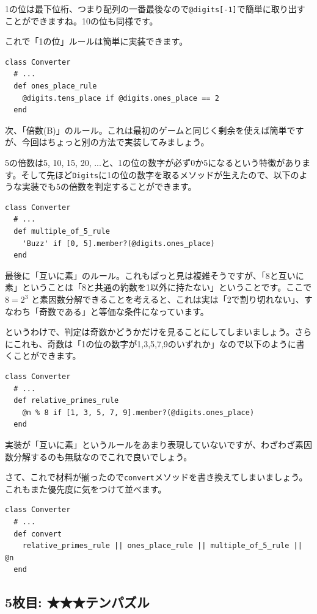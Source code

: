 \documentclass[index]{subfiles}
\begin{document}
1の位は最下位桁、つまり配列の一番最後なので\verb+@digits[-1]+で簡単に取り出すことができますね。10の位も同様です。

これで「1の位」ルールは簡単に実装できます。

\begin{lstlisting}
class Converter
  # ...
  def ones_place_rule
    @digits.tens_place if @digits.ones_place == 2
  end
\end{lstlisting}

次、「倍数(B)」のルール。これは最初のゲームと同じく剰余を使えば簡単ですが、今回はちょっと別の方法で実装してみましょう。

5の倍数は5, 10, 15, 20, ...と、1の位の数字が必ず0か5になるという特徴があります。そして先ほど\verb+Digits+に1の位の数字を取るメソッドが生えたので、以下のような実装でも5の倍数を判定することができます。

\begin{lstlisting}
class Converter
  # ...
  def multiple_of_5_rule
    'Buzz' if [0, 5].member?(@digits.ones_place)
  end
\end{lstlisting}

最後に「互いに素」のルール。これもぱっと見は複雑そうですが、「8と互いに素」ということは「8と共通の約数を1以外に持たない」ということです。ここで $8 = 2 ^ 3$ と素因数分解できることを考えると、これは実は「2で割り切れない」、すなわち「奇数である」と等価な条件になっています。

というわけで、判定は奇数かどうかだけを見ることにしてしまいましょう。さらにこれも、奇数は「1の位の数字が1,3,5,7,9のいずれか」なので以下のように書くことができます。

\begin{lstlisting}
class Converter
  # ...
  def relative_primes_rule
    @n % 8 if [1, 3, 5, 7, 9].member?(@digits.ones_place)
  end
\end{lstlisting}

実装が「互いに素」というルールをあまり表現していないですが、わざわざ素因数分解するのも無駄なのでこれで良いでしょう。

さて、これで材料が揃ったので\verb+convert+メソッドを書き換えてしまいましょう。これもまた優先度に気をつけて並べます。

\begin{lstlisting}
class Converter
  # ...
  def convert
    relative_primes_rule || ones_place_rule || multiple_of_5_rule || @n
  end
\end{lstlisting}

  \subsection{5枚目: ★★★テンパズル}
\end{document}
